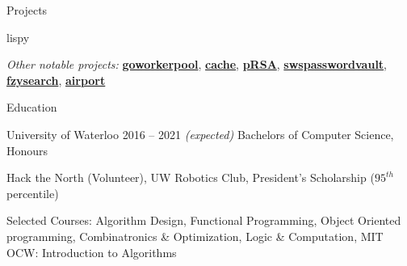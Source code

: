 \documentclass{resume} %
\begin{document}
\begin{rSection}{Projects}
\begin{rSubsection}{lispy}
  \end{rSubsection}

  \begin{rMinisection}
    \item {\em Other notable projects:}
      \href{https://github.com/ridwanmsharif/goworkerpool}{\textbf{goworkerpool}},
      \href{https://github.com/ridwanmsharif/cache}{\textbf{cache}},
      \href{https://github.com/ridwanmsharif/prsa}{\textbf{pRSA}},
      \href{https://www.ncr.com}{\textbf{swspasswordvault}},
      \href{https://github.com/ridwanmsharif/fzysearch}{\textbf{fzysearch}},
      \href{https://github.com/ridwanmsharif/airport}{\textbf{airport}}
  \end{rMinisection}
\end{rSection}


\begin{rSection}{Education}
  \begin{rSubsection}{University of Waterloo}
		     {2016 -- 2021 \em (expected)}
		     {Bachelors of Computer Science, Honours}
		     {}
    \item Hack the North (Volunteer), UW Robotics Club, President's Scholarship
      ($95^{th}$ percentile)
    \item Selected Courses: Algorithm Design, Functional Programming, Object
      Oriented programming, Combinatronics \& Optimization, Logic \&
      Computation, MIT OCW: Introduction to Algorithms
  \end{rSubsection}
\end{rSection} 
\end{document}

